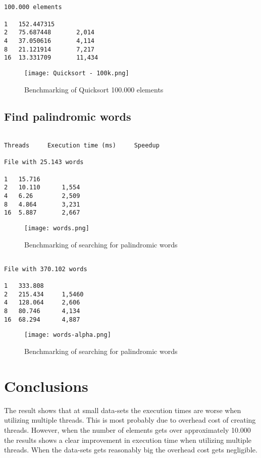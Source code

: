 \documentclass{article}
\begin{document}
\begin{verbatim}
 
100.000 elements

1   152.447315
2   75.687448       2,014
4   37.050616       4,114
8   21.121914       7,217	
16  13.331709       11,434

\end{verbatim}

\begin{figure}[h]
\centering
\texttt{[image: Quicksort - 100k.png]}
\caption{Benchmarking of Quicksort 100.000 elements}
\end{figure}      
\clearpage

\subsection{Find palindromic words }

\begin{verbatim}

Threads     Execution time (ms)     Speedup

File with 25.143 words

1   15.716
2   10.110      1,554
4   6.26        2,509
8   4.864       3,231 
16  5.887       2,667
\end{verbatim}

\begin{figure}[h]
\centering
\texttt{[image: words.png]}
\caption{Benchmarking of searching for palindromic words}
\end{figure}      
\clearpage

\begin{verbatim}
    
File with 370.102 words 

1   333.808		
2   215.434     1,5460
4   128.064     2,606
8   80.746      4,134
16  68.294      4,887

\end{verbatim}

\begin{figure}[h]
\centering
\texttt{[image: words-alpha.png]}
\caption{Benchmarking of searching for palindromic words}
\end{figure}      

\section{Conclusions}

The result shows that at small data-sets the execution times are worse when utilizing multiple threads. This is most probably due to overhead cost of creating threads. However, when the number of elements gets over approximately 10.000 the results shows a clear improvement in execution time when utilizing multiple threads. When the data-sets gets reasonably big the overhead cost gets negligible. 
\end{document}
